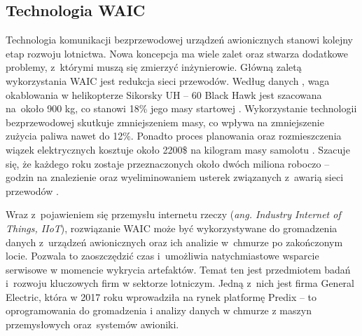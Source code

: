 \documentclass[a4paper, 12pt, twoside]{article}
\begin{document}
\subsection{Technologia WAIC} \label{waic}
Technologia komunikacji bezprzewodowej urządzeń awionicznych stanowi kolejny etap rozwoju lotnictwa. Nowa koncepcja ma wiele zalet oraz stwarza dodatkowe problemy, z~którymi muszą się zmierzyć inżynierowie. Główną zaletą wykorzystania WAIC jest redukcja sieci przewodów. Według danych \cite{waicDesign}, waga okablowania w helikopterze Sikorsky UH -- 60 Black Hawk jest szacowana na~około 900 kg, co stanowi 18\% jego masy startowej \cite{blackHawk}. Wykorzystanie technologii bezprzewodowej skutkuje zmniejszeniem masy, co wpływa na zmniejszenie zużycia paliwa nawet do 12\%. Ponadto proces planowania oraz rozmieszczenia wiązek elektrycznych kosztuje około 2200\$ na kilogram masy samolotu \cite{waicDesign}. Szacuje się, że każdego roku zostaje przeznaczonych około dwóch miliona roboczo -- godzin na znalezienie oraz wyeliminowaniem usterek związanych z~awarią sieci przewodów \cite{waicDesign}. 

Wraz z~pojawieniem się przemysłu internetu rzeczy (\textit{ang. Industry Internet of Things, IIoT}), rozwiązanie WAIC może być wykorzystywane do gromadzenia danych z~urządzeń awionicznych oraz ich analizie w~chmurze po zakończonym locie. Pozwala to zaoszczędzić czas i~umożliwia natychmiastowe wsparcie serwisowe w momencie wykrycia artefaktów. Temat ten jest przedmiotem badań i~rozwoju kluczowych firm w sektorze lotniczym. Jedną z~nich jest firma General Electric, która w 2017 roku wprowadziła na rynek platformę Predix -- to oprogramowania do gromadzenia i analizy danych w chmurze z maszyn przemysłowych oraz~systemów awioniki.
\end{document}
